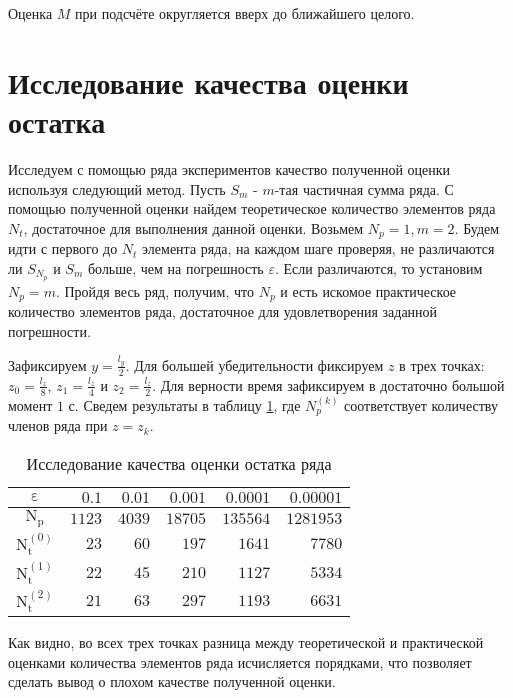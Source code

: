 Оценка $M$ при подсчёте округляется вверх до ближайшего целого.

\section{Исследование качества оценки остатка}
Исследуем с помощью ряда экспериментов качество полученной оценки используя следующий метод. Пусть $S_m$ - $m$-тая частичная сумма ряда.
С помощью полученной оценки найдем теоретическое количество элементов ряда $N_t$, достаточное для выполнения данной оценки. 
Возьмем $N_{p} = 1, m = 2$. Будем идти с первого до $N_t$ элемента ряда, на каждом шаге проверяя, не различаются ли $S_{N_p}$ и $S_m$ больше, чем на погрешность $\varepsilon$. Если различаются, то установим $N_p = m$. Пройдя весь ряд, получим, что $N_p$ и есть искомое практическое количество элементов ряда, достаточное для удовлетворения заданной погрешности.

Зафиксируем $y = \frac{l_y}{2}$. Для большей убедительности фиксируем $z$ в трех точках: $z_0 = \frac{l_z}{8}$, $z_1 = \frac{l_z}{4}$ 
и $z_2 = \frac{l_z}{2}$. Для верности время зафиксируем в достаточно большой момент $1$ с. Сведем результаты в таблицу 
\ref{tab:rem:experiment}, где $N_{p}^{(k)}$ соответствует количеству членов ряда при $z = z_k$.

\begin{table}[!hbtp]
  \centering
  \caption{Исследование качества оценки остатка ряда}
  \begin{tabular}{|c|r|r|r|r|r|}
    \hline
    $\mathrm{\varepsilon}$ & $0.1$ & $0.01$ & $0.001$ & $0.0001$ & $0.00001$ \\
    \hline
    $\mathrm{N_p}$ & $1123$ & $4039$ & $18705$ & $135564$ & $1281953$ \\
    \hline
    $\mathrm{N_t^{(0)}}$ & $23$ & $60$ & $197$ & $1641$ & $7780$ \\
    \hline
    $\mathrm{N_t^{(1)}}$ & $22$ & $45$ & $210$ & $1127$ & $5334$ \\
    \hline
    $\mathrm{N_t^{(2)}}$ & $21$ & $63$ & $297$ & $1193$ & $6631$ \\
    \hline
  \end{tabular}
  \label{tab:rem:experiment}
\end{table}

Как видно, во всех трех точках разница между теоретической и практической оценками количества элементов ряда исчисляется порядками,
что позволяет сделать вывод о плохом качестве полученной оценки.
